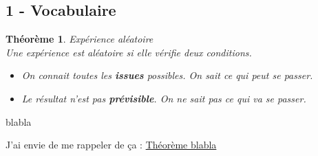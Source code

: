 \documentclass[12pt]{article}
\begin{document}
\newtheorem{Theorem}{Théorème}

\subsection*{1 - Vocabulaire}
\begin{Theorem}{Expérience aléatoire} \label{thm1-ea}\\
Une expérience est aléatoire si elle vérifie deux conditions.


\begin{itemize}
\item On connait toutes les \textbf{issues} possibles. \textit{On sait ce qui peut se passer.}
\item Le résultat n'est pas \textbf{prévisible}. \textit{On ne sait pas ce qui va se passer.}
\end{itemize}

\end{Theorem}

\newpage
blabla
\newpage

J'ai envie de me rappeler de ça : \hyperref[thm1-ea]{Théorème blabla}
\end{document}
